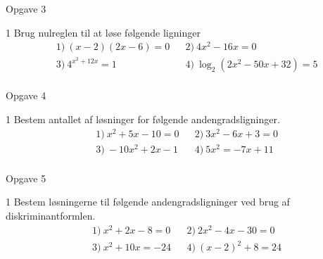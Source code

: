 \documentclass[12pt,x11names,a4paper]{article}
\begin{document}
\begin{opgavetekst}{Opgave 3}
\end{opgavetekst}
\begin{delopgave}{}{1}
	Brug nulreglen til at løse følgende ligninger
	\begin{align*}
		&1) \ (x-2)(2x-6) = 0  & &2) \ 4x^2 - 16x = 0  \\
		&3) \ 4^{x^2+12x} = 1  & &4) \ \log_2(2x^2 - 50x + 32) = 5  \\
	\end{align*}
\end{delopgave}
\begin{opgavetekst}{Opgave 4}
\end{opgavetekst}
\begin{delopgave}{}{1}
	Bestem antallet af løsninger for følgende andengradsligninger. 
	\begin{align*}
		&1) \ x^2 + 5x - 10 = 0 & &2) \ 3x^2 - 6x + 3 = 0 \\
		&3) \ -10x^2 +2x - 1 & &4) \ 5x^2 = -7x + 11 \\
	\end{align*}
\end{delopgave}
\begin{opgavetekst}{Opgave 5}
\end{opgavetekst}
\begin{delopgave}{}{1}
	Bestem løsningerne til følgende andengradsligninger ved brug af diskriminantformlen.
	\begin{align*}
		&1) \ x^2 + 2x - 8 = 0 & &2) \ 2x^2-4x-30 = 0 \\
		&3) \ x^2 + 10x  = -24 & &4) \ (x-2)^2+ 8 = 24 \\
	\end{align*}
\end{delopgave}
\newpage
\end{document}
